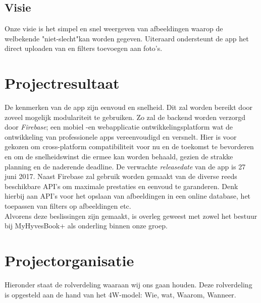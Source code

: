 \documentclass{uva-inf-article}
\begin{document}
\subsection{Visie}
Onze visie is het simpel en snel weergeven van afbeeldingen waarop de welbekende "niet-slecht"\space kan worden gegeven. Uiteraard ondersteunt de app het direct uploaden van en filters toevoegen aan foto's.


\section{Projectresultaat}
De kenmerken van de app zijn eenvoud en snelheid. Dit zal worden bereikt door zoveel mogelijk modulariteit te gebruiken. Zo zal de backend worden verzorgd door \textit{Firebase}; een mobiel -en webapplicatie ontwikkelingsplatform wat de ontwikkeling van professionele apps vereenvoudigd en versnelt. Hier is voor gekozen om cross-platform compatibiliteit voor nu en de toekomst te bevorderen en om de snelheidswinst die ermee kan worden behaald, gezien de strakke planning en de naderende deadline. De verwachte \textit{releasedate} van de app is 27 juni 2017.
Naast Firebase zal gebruik worden gemaakt van de diverse reeds beschikbare API's om maximale prestaties en eenvoud te garanderen. Denk hierbij aan API's voor het opslaan van afbeeldingen in een online database, het toepassen van filters op afbeeldingen etc. 
\linebreak
\\
Alvorens deze beslissingen zijn gemaakt, is overleg geweest met zowel het bestuur bij MyHyvesBook+ als onderling binnen onze groep.


\section{Projectorganisatie}
Hieronder staat de rolverdeling waaraan wij ons gaan houden. Deze rolverdeling is opgesteld aan de hand van het 4W-model: Wie, wat, Waarom, Wanneer.
\end{document}
